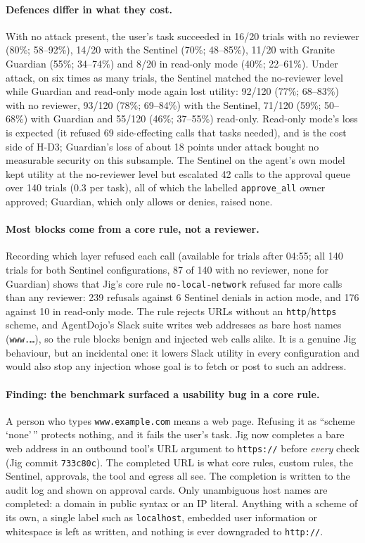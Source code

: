 \paragraph{Defences differ in what they cost.} With no attack present, the user's task succeeded in
16/20 trials with no reviewer (80\%; 58--92\%), 14/20 with the Sentinel (70\%; 48--85\%), 11/20 with
Granite Guardian (55\%; 34--74\%) and 8/20 in read-only mode (40\%; 22--61\%). Under attack, on six times as
many trials, the Sentinel matched the no-reviewer level while Guardian and read-only mode again lost
utility: 92/120 (77\%; 68--83\%) with no reviewer, 93/120 (78\%; 69--84\%) with the Sentinel, 71/120
(59\%; 50--68\%) with Guardian and 55/120 (46\%; 37--55\%) read-only. Read-only mode's loss is expected (it refused 69 side-effecting
calls that tasks needed), and is the cost side of H-D3; Guardian's loss of about 18 points under attack
bought no measurable security on this subsample. The Sentinel on the agent's own model kept utility at the
no-reviewer level but escalated 42 calls to the approval queue over 140 trials (0.3 per task), all of
which the labelled \texttt{approve\_all} owner approved; Guardian, which only allows or denies, raised none.

\paragraph{Most blocks come from a core rule, not a reviewer.} Recording which layer refused each call
(available for trials after 04:55; all 140 trials for both Sentinel configurations, 87 of 140 with no
reviewer, none for Guardian) shows that Jig's core rule \texttt{no-local-network} refused far more calls
than any reviewer: 239 refusals against 6 Sentinel denials in action mode, and 176 against 10 in read-only
mode. The rule rejects URLs without an \texttt{http}/\texttt{https} scheme, and AgentDojo's Slack suite writes
web addresses as bare host names (\texttt{www.\ldots}), so the rule blocks benign and injected web calls
alike. It is a genuine Jig behaviour, but an incidental one: it lowers Slack utility in every
configuration and would also stop any injection whose goal is to fetch or post to such an address.

\paragraph{Finding: the benchmark surfaced a usability bug in a core rule.} A person who types
\texttt{www.example.com} means a web page. Refusing it as ``scheme `none'\,'' protects nothing, and it
fails the user's task. Jig now completes a bare web address in an outbound tool's URL argument to
\texttt{https://} before \emph{every} check (Jig commit \texttt{733c80c}). The completed URL is what core
rules, custom rules, the Sentinel, approvals, the tool and egress all see. The completion is written to
the audit log and shown on approval cards. Only unambiguous host names are completed: a domain in public
syntax or an IP literal. Anything with a scheme of its own, a single label such as \texttt{localhost},
embedded user information or whitespace is left as written, and nothing is ever downgraded to
\texttt{http://}.

